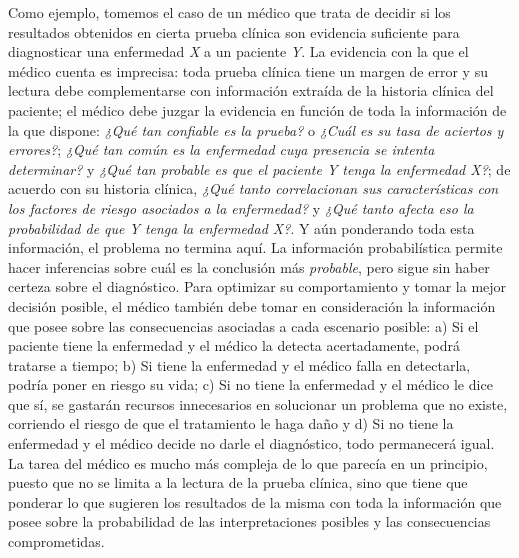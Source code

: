 Como ejemplo, tomemos el caso de un médico que trata de decidir si los resultados obtenidos en cierta prueba clínica son evidencia suficiente para diagnosticar una enfermedad \textit{X} a un paciente \textit{Y}. La evidencia con la que el médico cuenta es imprecisa: toda prueba clínica tiene un margen de error y su lectura debe complementarse con información extraída de la historia clínica del paciente; el médico debe juzgar la evidencia en función de toda la información de la que dispone: \textit{¿Qué tan confiable es la prueba?} o \textit{¿Cuál es su tasa de aciertos y errores?}; \textit{¿Qué tan común es la enfermedad cuya presencia se intenta determinar?} y \textit{¿Qué tan probable es que el paciente Y tenga la enfermedad X?}; de acuerdo con su historia clínica, \textit{¿Qué tanto correlacionan sus características con los factores de riesgo asociados a la enfermedad?} y \textit{¿Qué tanto afecta eso la probabilidad de que Y tenga la enfermedad X?}. Y aún ponderando toda esta información, el problema no termina aquí. La información probabilística permite hacer inferencias sobre cuál es la conclusión más \textit{probable}, pero sigue sin haber certeza sobre el diagnóstico. Para optimizar su comportamiento y tomar la mejor decisión posible, el médico también debe tomar en consideración la información que posee sobre las consecuencias asociadas a cada escenario posible: a) Si el paciente tiene la enfermedad y el médico la detecta acertadamente, podrá tratarse a tiempo; b) Si tiene la enfermedad y el médico falla en detectarla, podría poner en riesgo su vida; c) Si no tiene la enfermedad y el médico le dice que sí, se gastarán recursos innecesarios en solucionar un problema que no existe, corriendo el riesgo de que el tratamiento le haga daño y d) Si no tiene la enfermedad y el médico decide no darle el diagnóstico, todo permanecerá igual. La tarea del médico es mucho más compleja de lo que parecía en un principio, puesto que no se limita a la lectura de la prueba clínica, sino que tiene que ponderar lo que sugieren los resultados de la misma con toda la información que posee sobre la probabilidad de las interpretaciones posibles y las consecuencias comprometidas.\\

